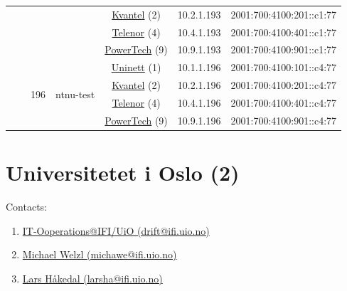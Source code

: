 \begin{small}
\begin{center}
\begin{longtable}{|c|c|c|c|c|c|c|c|}
  &  &  &  & \multicolumn{2}{|c|}{\tiny{\href{http://kvantel.no}{Kvantel} (2)}} & \tiny{10.2.1.193} & \tiny{2001:700:4100:201::c1:77} \\* \cline{5-5}\cline{6-6}\cline{7-7}\cline{8-8}
  &  &  &  & \multicolumn{2}{|c|}{\tiny{\href{https://www.telenor.no}{Telenor} (4)}} & \tiny{10.4.1.193} & \tiny{2001:700:4100:401::c1:77} \\* \cline{5-5}\cline{6-6}\cline{7-7}\cline{8-8}
  &  &  &  & \multicolumn{2}{|c|}{\tiny{\href{http://www.powertech.no}{PowerTech} (9)}} & \tiny{10.9.1.193} & \tiny{2001:700:4100:901::c1:77} \\* \cline{3-3}\cline{4-4}\cline{5-5}\cline{6-6}\cline{7-7}\cline{8-8}
  &  & \multirow{4}{*}{\tiny{196}} & \multicolumn{1}{|l|}{\multirow{4}{*}{\tiny{ntnu-test}}} & \multicolumn{2}{|c|}{\tiny{\href{https://www.uninett.no}{Uninett} (1)}} & \tiny{10.1.1.196} & \tiny{2001:700:4100:101::c4:77} \\* \cline{5-5}\cline{6-6}\cline{7-7}\cline{8-8}
  &  &  &  & \multicolumn{2}{|c|}{\tiny{\href{http://kvantel.no}{Kvantel} (2)}} & \tiny{10.2.1.196} & \tiny{2001:700:4100:201::c4:77} \\* \cline{5-5}\cline{6-6}\cline{7-7}\cline{8-8}
  &  &  &  & \multicolumn{2}{|c|}{\tiny{\href{https://www.telenor.no}{Telenor} (4)}} & \tiny{10.4.1.196} & \tiny{2001:700:4100:401::c4:77} \\* \cline{5-5}\cline{6-6}\cline{7-7}\cline{8-8}
  &  &  &  & \multicolumn{2}{|c|}{\tiny{\href{http://www.powertech.no}{PowerTech} (9)}} & \tiny{10.9.1.196} & \tiny{2001:700:4100:901::c4:77} \\ \hline
\end{longtable}
\end{center}
\end{small}



\section{Universitetet i Oslo (2)}
\label{sec:UiO}

Contacts:
\begin{enumerate}
 \item {}\href{mailto:drift@ifi.uio.no}{IT-Ooperations@IFI/UiO (drift@ifi.uio.no)}
 \item {}\href{mailto:michawe@ifi.uio.no}{Michael Welzl (michawe@ifi.uio.no)}
 \item {}\href{mailto:larsha@ifi.uio.no}{Lars Håkedal (larsha@ifi.uio.no)}
\end{enumerate}

